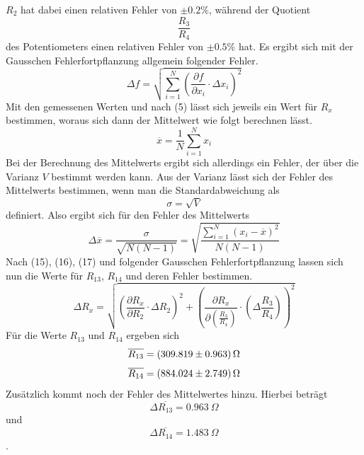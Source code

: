 $R_2$ hat dabei einen relativen Fehler von $\pm 0.2 \%$, während der Quotient
\begin{equation*}
    \frac{R_\text{3}}{R_\text{4}}
\end{equation*}
des Potentiometers einen relativen Fehler von $\pm 0.5 \%$ hat.
Es ergibt sich mit der Gausschen Fehlerfortpflanzung allgemein folgender Fehler.
\begin{equation}
    \Delta f = \sqrt{\sum \limits_{i=1}^{N} \left (\frac{\partial f}{\partial x_i} \cdot \Delta x_i \right)^2}
\end{equation}
Mit den gemessenen Werten und nach (5) lässt sich jeweils ein Wert für $R_x$ bestimmen, woraus sich dann der Mittelwert wie folgt berechnen lässt.
\begin{equation}
    \overline{x} = \frac{1}{N} \sum_{i=1}^N x_i
\end{equation}
Bei der Berechnung des Mittelwerts ergibt sich allerdings ein Fehler, der über die Varianz $V$ bestimmt werden kann.
Aus der Varianz lässt sich der Fehler des Mittelwerts bestimmen, wenn man die Standardabweichung als
\begin{equation*}
    \sigma = \sqrt{V}
\end{equation*}
definiert.
Also ergibt sich für den Fehler des Mittelwerts
\begin{equation}
    \Delta \overline{x} = \frac{\sigma}{\sqrt{N(N-1)}} = \sqrt{\frac{\sum \limits_{i=1}^N (x_i-\overline{x})^2}{N(N-1)}}
\end{equation}
Nach (15), (16), (17) und folgender Gausschen Fehlerfortpflanzung lassen sich nun die Werte für $R_\text{13}$, $R_\text{14}$ und deren Fehler bestimmen.
\begin{equation}
    \Delta R_x = \sqrt{\left (\frac{\partial R_x}{\partial R_2}\cdot \Delta R_2 \right )^2 + \left (\frac{\partial R_x}{\partial \left (\frac{R_3}{R_4}\right )} \cdot \left (\Delta \frac{R_3}{R_4}\right )\right )^2}
\end{equation}
Für die Werte $R_\text{13}$ und $R_\text{14}$ ergeben sich
\begin{equation}
    \overline{R_\text{13}} = \SI{309,819 \pm 0,963}{\Omega}\notag
\end{equation} 
\begin{equation}
    \overline{R_\text{14}} = \SI{884,024 \pm 2,749}{\Omega}\notag
\end{equation}
Zusätzlich kommt noch der Fehler des Mittelwertes hinzu.
Hierbei beträgt \\
\begin{equation*}
    \Delta \overline{R_\text{13}} = \SI{0,963}{\Omega}
\end{equation*}
und
\begin{equation*}
    \Delta \overline{R_\text{14}} = \SI{1,483}{\Omega}
\end{equation*}.

